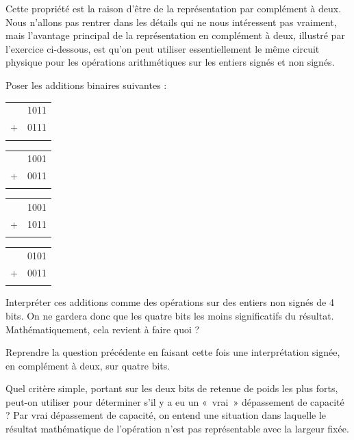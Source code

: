 \documentclass{magnoliaold}
\begin{document}
\begin{remarques}
  \remarque
  Cette propriété est la raison d'être de la représentation par complément
  à deux.
  \remarque
  Nous n'allons pas rentrer dans les détails qui ne nous intéressent pas
  vraiment, mais l'avantage principal de la représentation en complément à
  deux, illustré par l'exercice ci-dessous, est qu'on peut utiliser
  essentiellement le même circuit physique pour les opérations arithmétiques
  sur les entiers signés et non signés.
\end{remarques}
\vspace{2ex}
\begin{exoUnique}
  \exo
  \begin{questions}
    \item Poser les additions binaires suivantes :
          \begin{multicols}{4}
            \begin{tabular}{rl}
              & 1011 \\
              + & 0111 \\
              \hline
              &
            \end{tabular}
            \begin{tabular}{rl}
              & 1001 \\
              + & 0011 \\
              \hline
              &
            \end{tabular}
            \begin{tabular}{rl}
              & 1001 \\
              + & 1011 \\
              \hline
              &
            \end{tabular}
            \begin{tabular}{rl}
              & 0101 \\
              + & 0011 \\
              \hline
              &
            \end{tabular}
          \end{multicols}
    \item Interpréter ces additions comme des opérations sur des
          entiers non signés de 4 bits. On ne gardera donc que les
          quatre bits les moins significatifs du résultat.
          Mathématiquement, cela revient à faire quoi ?
    \item Reprendre la question précédente en faisant cette fois
          une interprétation signée, en complément à deux, sur
          quatre bits.
    \item Quel critère simple, portant sur les deux bits de retenue
          de poids les plus forts, peut-on utiliser pour déterminer
          s'il y a eu un «~vrai~» dépassement de capacité ?
          Par \og vrai \fg dépassement de capacité, on entend une
          situation dans laquelle le résultat mathématique de
          l'opération n'est pas représentable avec la largeur fixée.
  \end{questions}
\end{exoUnique}
\vspace{2ex}
\end{document}
